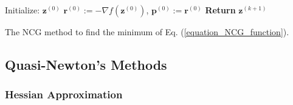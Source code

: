 \documentclass[lang=cn,10pt]{gorgeousnbook}
\numberwithin{equation}{section}%
\numberwithin{figure}{section}%
\begin{document}
\SetAlCapSkip{0.5em}
\IncMargin{0.8em}
\begin{algorithm2e}[!t]
\DontPrintSemicolon
    Initialize: $\boldsymbol{z}^{(0)}$\;
    $\boldsymbol{r}^{(0)} := -\nabla f(\boldsymbol{z}^{(0)})$, $\boldsymbol{p}^{(0)} := \boldsymbol{r}^{(0)}$\;
    \textbf{Return} $\boldsymbol{z}^{(k+1)}$
\caption{The NCG method to find the minimum of Eq. (\ref{equation_NCG_function}).}\label{algorithm_nonlinear_conjugate_gradient}
\end{algorithm2e}
\DecMargin{0.8em}

\subsection{Quasi-Newton's Methods}\label{section_quasi_Newton_method}


\subsubsection{Hessian Approximation}
\end{document}
